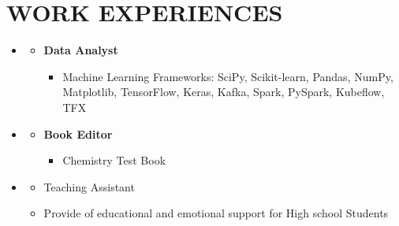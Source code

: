 \documentclass[10pt,a4paper,sans]{moderncv} %
\begin{document}
	\vspace{ 1.3 em}
	
	\vspace{-2.3em}
	\section{WORK EXPERIENCES}
	
	
	\begin{itemize}
		\item \href{https://www.foumanchimie.com/}{}
		
		\begin{itemize}
			\item \textbf{Data Analyst} 
			    \begin{itemize}
			        \item Machine Learning Frameworks: \newline
			        SciPy, Scikit-learn, Pandas, NumPy, Matplotlib, TensorFlow, Keras, Kafka, Spark, PySpark, Kubeflow, TFX
			        
				\end{itemize}
		\end{itemize}
	\end{itemize}
	
\vspace{0.71 em}

	\begin{itemize}
		\item \href{https://kheilisabz.com/}{}
		
		\begin{itemize}
			\item \textbf{Book Editor} 
			    \begin{itemize}
			        \item Chemistry Test Book 
			        
				\end{itemize}
		\end{itemize}
	\end{itemize}
	
	
	\vspace{0.71 em}
	
		\begin{itemize}
		
		\item \href{https://www.kanoon.ir/}{}
		
		
		\begin{itemize}
			
			\item Teaching Assistant
				\item Provide of educational and emotional support for High school Students

		\end{itemize}
	\end{itemize}
	
\end{document}
